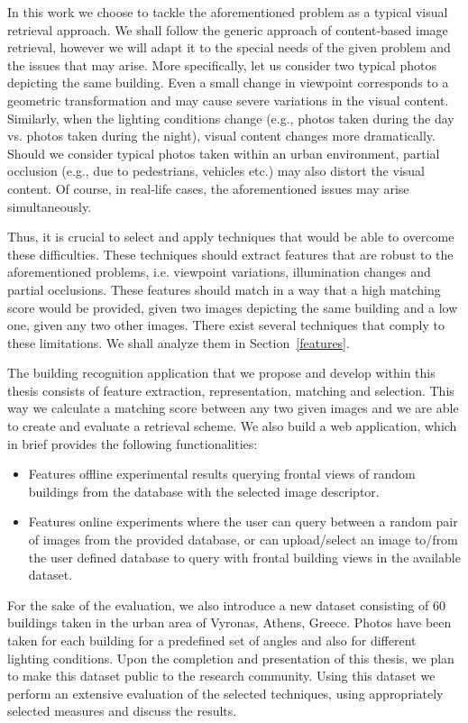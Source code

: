 In this work we choose to tackle the aforementioned problem as a typical visual retrieval approach. We shall follow the generic approach of content-based image retrieval, however we will adapt it to the special needs of the given problem and the issues that may arise. More specifically, let us consider two typical photos depicting the same building. Even a small change in viewpoint corresponds to a geometric transformation and may cause severe variations in the visual content. Similarly, when the lighting conditions change (e.g., photos taken during the day vs. photos taken during the night), visual content changes more dramatically. Should we consider typical photos taken within an urban environment, partial occlusion (e.g., due to pedestrians, vehicles etc.) may also distort the visual content.  Of course, in real-life cases, the aforementioned issues may arise simultaneously. 

Thus, it is crucial to select and apply techniques that would be able to overcome these difficulties. These techniques should extract features that are robust to the aforementioned problems, i.e. viewpoint variations, illumination changes and partial occlusions. These features should match in a way that a high matching score would be provided, given two images depicting the same building and a low one, given any two other images. There exist several techniques that comply to these limitations. We shall analyze them in Section~\ref{features}.

The building recognition application that we propose and develop within this thesis consists of feature extraction, representation, matching and selection. This way we calculate a matching score between any two given images and we are able to create and evaluate a retrieval scheme. We also build a web application, which in brief provides the following functionalities:
\begin{itemize}
    \item Features offline experimental results querying frontal views of random buildings from the database with the selected image descriptor.
    \item Features online experiments where the user can query between a random pair of images from the provided database, or can upload/select an image
    to/from the user defined database to query with frontal building views in the available dataset.
\end{itemize}

For the sake of the evaluation, we also introduce a new dataset consisting of 60 buildings taken in the urban area of Vyronas, Athens, Greece. Photos have been taken for each building for a predefined set of angles and also for different lighting conditions. Upon the completion and presentation of this thesis, we plan to make this dataset public to the research community. Using this dataset we perform an extensive evaluation of the selected techniques, using appropriately selected measures and discuss the results.
 
